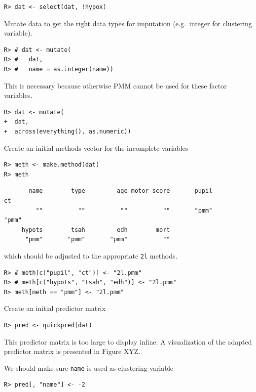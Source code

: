 \documentclass[
  article]{jss}
\begin{document}
\begin{verbatim}
R> dat <- select(dat, !hypox)
\end{verbatim}

Mutate data to get the right data types for imputation (e.g.~integer for
clustering variable).

\begin{verbatim}
R> # dat <- mutate(
R> #   dat,
R> #   name = as.integer(name))
\end{verbatim}

This is necessary because otherwise PMM cannot be used for these factor
variables.

\begin{verbatim}
R> dat <- mutate(
+  dat,
+  across(everything(), as.numeric))
\end{verbatim}

Create an initial methods vector for the incomplete variables

\begin{verbatim}
R> meth <- make.method(dat)
R> meth
\end{verbatim}

\begin{verbatim}
       name        type         age motor_score       pupil          ct 
         ""          ""          ""          ""       "pmm"       "pmm" 
     hypots        tsah         edh        mort 
      "pmm"       "pmm"       "pmm"          "" 
\end{verbatim}

which should be adjusted to the appropriate \texttt{2l} methods.

\begin{verbatim}
R> # meth[c("pupil", "ct")] <- "2l.pmm"
R> # meth[c("hypots", "tsah", "edh")] <- "2l.pmm"
R> meth[meth == "pmm"] <- "2l.pmm"
\end{verbatim}

Create an initial predictor matrix

\begin{verbatim}
R> pred <- quickpred(dat)
\end{verbatim}

This predictor matrix is too large to display inline. A visualization of
the adapted predictor matrix is presented in Figure XYZ.

We should make sure \texttt{name} is used as clustering variable

\begin{verbatim}
R> pred[, "name"] <- -2
\end{verbatim}
\end{document}
